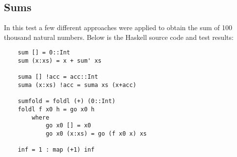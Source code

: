 \documentclass[en]{pracamgr}
\begin{document}
\subsection{Sums}

In this test a few different approaches were applied to
obtain the sum of 100 thousand natural numbers.
Below is the Haskell source code and test results:

\begin{verbatim}
    sum [] = 0::Int
    sum (x:xs) = x + sum' xs

    suma [] !acc = acc::Int
    suma (x:xs) !acc = suma xs (x+acc)

    sumfold = foldl (+) (0::Int)
    foldl f x0 h = go x0 h
        where
            go x0 [] = x0
            go x0 (x:xs) = go (f x0 x) xs

    inf = 1 : map (+1) inf
\end{verbatim}
\end{document}
